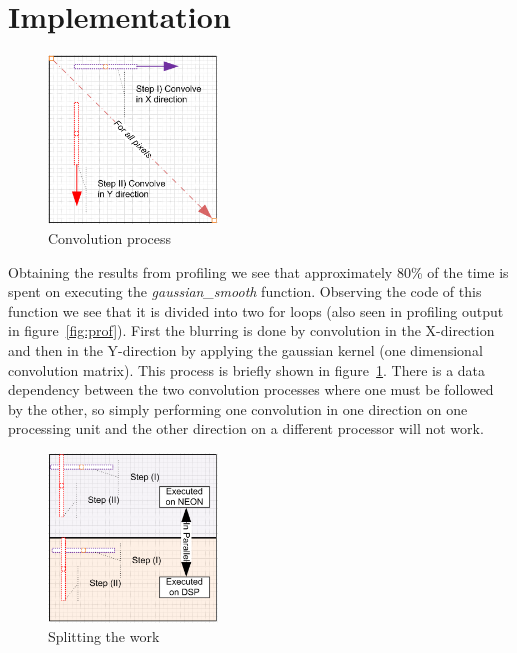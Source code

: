\section{Implementation}

\begin{figure}
\centering
\includegraphics[width=0.4\textwidth]{drawings/gaussian_general}
\caption{Convolution process}
\label{fig:convolution}
\end{figure}

Obtaining the results from profiling we see that approximately 80\% of the time is spent on executing the \textit{gaussian\_smooth} function. Observing the code of this function we see that it is divided into two for loops (also seen in profiling output in figure~\ref{fig:prof}).
First the blurring is done by convolution in the X-direction and then in the Y-direction by applying the gaussian kernel (one dimensional convolution matrix). This process is briefly shown in figure~\ref{fig:convolution}. There is a data dependency between the two convolution processes where one must be followed by the other, so simply performing one convolution in one direction on one processing unit and the other direction on a different processor will not work.


\begin{figure}
\centering
\includegraphics[width=0.4\textwidth]{drawings/gaussian_balancing}
\caption{Splitting the work}
\label{fig:balancing}
\end{figure}


